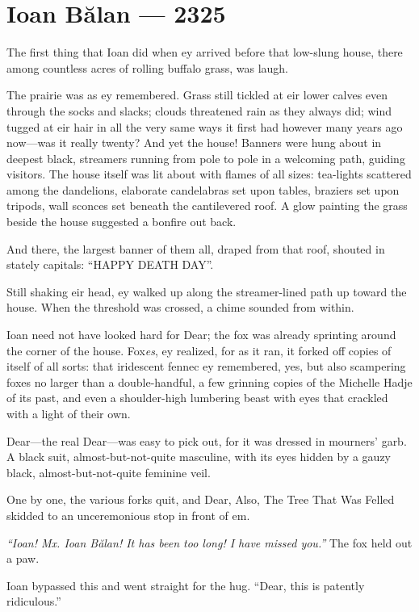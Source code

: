 \hypertarget{ioan-bux103lan-2325}{%
\chapter{Ioan Bălan — 2325}\label{ioan-bux103lan-2325}}

The first thing that Ioan did when ey arrived before that low-slung house, there among countless acres of rolling buffalo grass, was laugh.

The prairie was as ey remembered. Grass still tickled at eir lower calves even through the socks and slacks; clouds threatened rain as they always did; wind tugged at eir hair in all the very same ways it first had however many years ago now---was it really twenty? And yet the house! Banners were hung about in deepest black, streamers running from pole to pole in a welcoming path, guiding visitors. The house itself was lit about with flames of all sizes: tea-lights scattered among the dandelions, elaborate candelabras set upon tables, braziers set upon tripods, wall sconces set beneath the cantilevered roof. A glow painting the grass beside the house suggested a bonfire out back.

And there, the largest banner of them all, draped from that roof, shouted in stately capitals: ``HAPPY DEATH DAY''.

Still shaking eir head, ey walked up along the streamer-lined path up toward the house. When the threshold was crossed, a chime sounded from within.

Ioan need not have looked hard for Dear; the fox was already sprinting around the corner of the house. Fox\emph{es}, ey realized, for as it ran, it forked off copies of itself of all sorts: that iridescent fennec ey remembered, yes, but also scampering foxes no larger than a double-handful, a few grinning copies of the Michelle Hadje of its past, and even a shoulder-high lumbering beast with eyes that crackled with a light of their own.

Dear---the real Dear---was easy to pick out, for it was dressed in mourners' garb. A black suit, almost-but-not-quite masculine, with its eyes hidden by a gauzy black, almost-but-not-quite feminine veil.

One by one, the various forks quit, and Dear, Also, The Tree That Was Felled skidded to an unceremonious stop in front of em.

\emph{``Ioan! Mx. Ioan Bălan! It has been too long! I have missed you.''} The fox held out a paw.

Ioan bypassed this and went straight for the hug. ``Dear, this is patently ridiculous.''

